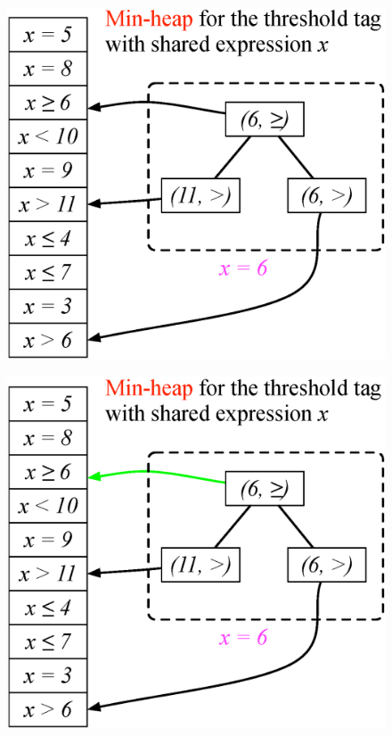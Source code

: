 \documentclass[mathserif,14pt,xcolor=table]{beamer}
\begin{document}
\begin{frame}
{\begin{figure}[ht!]
            \label{fig:fw}
        \end{figure}
    }
     {
        \begin{figure}[ht!]
            \centering
            \includegraphics[scale=0.50]{fig/tag_exp_6.eps}
            \label{fig:fw}
        \end{figure}
    }
     {
        \begin{figure}[ht!]
            \centering
            \includegraphics[scale=0.50]{fig/tag_exp_7.eps}

\end{figure}}
\end{frame}
\end{document}
